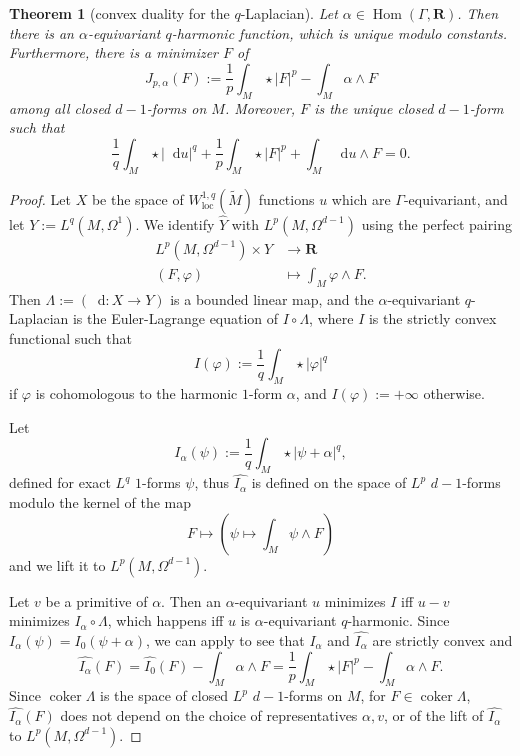 \documentclass[reqno,11pt]{amsart}
\newcommand{\RR}{\mathbf{R}}
\newcommand*\dif{\mathop{}\!\mathrm{d}}
\DeclareMathOperator{\Hom}{Hom}
\DeclareMathOperator{\coker}{coker}
\newcommand{\loc}{\mathrm{loc}}
\newtheorem{theorem}{Theorem}[section]
\theoremstyle{definition}
\numberwithin{equation}{section}
\begin{document}
\begin{theorem}[convex duality for the $q$-Laplacian]\label{mfmc qLaplacian}
Let $\alpha \in \Hom(\Gamma, \RR)$.
Then there is an $\alpha$-equivariant $q$-harmonic function,
which is unique modulo constants.
Furthermore, there is a minimizer $F$ of 
$$J_{p, \alpha}(F) := \frac{1}{p} \int_M \star |F|^p - \int_M \alpha \wedge F$$
among all closed $d - 1$-forms on $M$.
Moreover, $F$ is the unique closed $d - 1$-form such that
\begin{equation}\label{strong duality appendix}
	\frac{1}{q} \int_M \star |\dif u|^q + \frac{1}{p} \int_M \star |F|^p + \int_M \dif u \wedge F = 0.
\end{equation}
\end{theorem}
\begin{proof}
Let $X$ be the space of $W^{1, q}_\loc(\tilde M)$ functions $u$ which are $\Gamma$-equivariant, and let $Y := L^q(M, \Omega^1)$.
We identify $\hat Y$ with $L^p(M, \Omega^{d - 1})$ using the perfect pairing 
\begin{align*}
	L^p(M, \Omega^{d - 1}) \times Y &\to \RR \\
	(F, \varphi) &\mapsto \int_M \varphi \wedge F.
\end{align*}
Then $\Lambda := (\dif: X \to Y)$ is a bounded linear map, and the $\alpha$-equivariant $q$-Laplacian is the Euler-Lagrange equation of $I \circ \Lambda$, where $I$ is the strictly convex functional such that
$$I(\varphi) := \frac{1}{q} \int_M \star |\varphi|^q$$
if $\varphi$ is cohomologous to the harmonic $1$-form $\alpha$, and $I(\varphi) := +\infty$ otherwise.

Let
$$I_\alpha(\psi) := \frac{1}{q} \int_M \star |\psi + \alpha|^q,$$
defined for exact $L^q$ $1$-forms $\psi$, thus $\widehat{I_\alpha}$ is defined on the space of $L^p$ $d - 1$-forms modulo the kernel of the map
$$F \mapsto \left(\psi \mapsto \int_M \psi \wedge F\right)$$
and we lift it to $L^p(M, \Omega^{d - 1})$.

Let $v$ be a primitive of $\alpha$.
Then an $\alpha$-equivariant $u$ minimizes $I$ iff $u - v$ minimizes $I_\alpha \circ \Lambda$, which happens iff $u$ is $\alpha$-equivariant $q$-harmonic.
Since $I_\alpha(\psi) = I_0(\psi + \alpha)$, we can apply \cite[Chapter I, Remark 4.1]{Ekeland99} to see that $I_\alpha$ and $\widehat{I_\alpha}$ are strictly convex and
$$\widehat{I_\alpha}(F) = \widehat{I_0}(F) - \int_M \alpha \wedge F = \frac{1}{p} \int_M \star |F|^p - \int_M \alpha \wedge F.$$
Since $\coker \Lambda$ is the space of closed $L^p$ $d - 1$-forms on $M$, for $F \in \coker \Lambda$, $\widehat{I_\alpha}(F)$ does not depend on the choice of representatives $\alpha, v$, or of the lift of $\widehat{I_\alpha}$ to $L^p(M, \Omega^{d - 1})$.


\end{proof}
\end{document}
